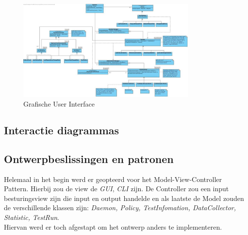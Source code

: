 \documentclass[i1]{oss}
\begin{document}
\begin{figure}[tbp]
\begin{center}
    \includegraphics[width=0.8\textwidth]{klassendiagram}
    \caption{Grafische User Interface}
	\label{fig:gui}
\end{center}
\end{figure}

\subsection{Interactie diagrammas}
\label{ssec:Interactiedia}







\subsection{Ontwerpbeslissingen en patronen}
\label{ssec:Ontwerpbeslissingen}

Helemaal in het begin werd er geopteerd voor het Model-View-Controller Pattern. Hierbij zou de view de \textit{GUI}, \textit{CLI} zijn. De Controller zou een input besturingsview zijn die input en output handelde en als laatste de Model zouden de verschillende klassen zijn: \textit{Daemon, Policy, TestInfomation, DataCollector, Statistic, TestRun}. \\

Hiervan werd er toch afgestapt om het ontwerp anders te implementeren. \\
\end{document}
